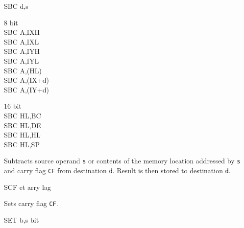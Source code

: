 \begin{basedescript}{
	\desclabelstyle{\multilinelabel}
	\desclabelwidth{3cm}}
\begin{DetailItem}{SBC d,s}
\begin{DetailVariants}
			\columnbreak
			\textnormal{8 bit}\\
			SBC A,IXH\UNDOC\\
			SBC A,IXL\UNDOC\\
			SBC A,IYH\UNDOC\\
			SBC A,IYL\UNDOC\\
			SBC A,(HL)\\
			SBC A,(IX+d)\\
			SBC A,(IY+d)

			\columnbreak
			\textnormal{16 bit}\\
			SBC HL,BC\\
			SBC HL,DE\\
			SBC HL,HL\\
			SBC HL,SP
		\end{DetailVariants}
		
		Subtracts source operand {\tt s} or contents of the memory location addressed by {\tt s} and carry flag {\tt CF} from destination {\tt d}. Result is then stored to destination {\tt d}.

		\begin{DetailEffects}[v]
			\FlagsSBCr[8-bit]
			\FlagsSBCrr[16-bit]
		\end{DetailEffects}
						
		\begin{DetailTiming}
		\end{DetailTiming}

	\end{DetailItem}

	\begin{DetailItem}{SCF}
		{et arry \IH{F}lag}
		{\SymSCF}

		Sets carry flag {\tt CF}.

		\begin{DetailEffects}
			\FlagsSCF
		\end{DetailEffects}
						
		\begin{DetailTiming}
			\DetailTime{1}{4}
		\end{DetailTiming}

	\end{DetailItem}

	\pagebreak
	\begin{DetailItem}{SET b,s}
		{ bit}
		{\SymSET{s}}


\end{DetailItem}
\end{basedescript}
